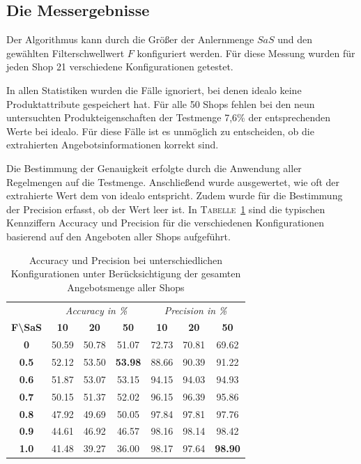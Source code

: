 \subsection{Die Messergebnisse}
\label{subsec:genauigkeitsmessung}

Der Algorithmus kann durch die Größer der Anlernmenge $SaS$ und den gewählten Filterschwellwert $F$ konfiguriert werden.
Für diese Messung wurden für jeden Shop 21 verschiedene Konfigurationen getestet.

In allen Statistiken wurden die Fälle ignoriert, bei denen idealo keine Produktattribute gespeichert hat.
Für alle 50 Shops fehlen bei den neun untersuchten Produkteigenschaften der Testmenge 7,6\% der entsprechenden Werte
bei idealo.
Für diese Fälle ist es unmöglich zu entscheiden, ob die extrahierten Angebotsinformationen korrekt sind.

Die Bestimmung der Genauigkeit erfolgte durch die Anwendung aller Regelmengen auf die Testmenge.
Anschließend wurde ausgewertet, wie oft der extrahierte Wert dem von idealo entspricht.
Zudem wurde für die Bestimmung der Precision erfasst, ob der Wert leer ist.
In \textsc{Tabelle}~\ref{tab:accuracy-precision} sind die typischen Kennziffern Accuracy und Precision für die
verschiedenen Konfigurationen basierend auf den Angeboten aller Shops aufgeführt.

\begin{table}[h]
    \centering
    \begin{tabular}{ c | c c c | c c c }
        &   \multicolumn{3}{c}{\textit{Accuracy in \%}}    &   \multicolumn{3}{c}{\textit{Precision in \%}} \\
        \textbf{F\textbackslash SaS} & \textbf{10} & \textbf{20} & \textbf{50} & \textbf{10} & \textbf{20} & \textbf{50}  \\
        \hline
        \textbf{0}       &   50.59 &   50.78 &   51.07         &   72.73 &   70.81 &   69.62 \\
        \textbf{0.5}     &   52.12 &   53.50 &   \textbf{53.98}&   88.66 &   90.39 &   91.22 \\
        \textbf{0.6}     &   51.87 &   53.07 &   53.15         &   94.15 &   94.03 &   94.93 \\
        \textbf{0.7}     &   50.15 &   51.37 &   52.02         &   96.15 &   96.39 &   95.86 \\
        \textbf{0.8}     &   47.92 &   49.69 &   50.05         &   97.84 &   97.81 &   97.76 \\
        \textbf{0.9}     &   44.61 &   46.92 &   46.57         &   98.16 &   98.14 &   98.42 \\
        \textbf{1.0}     &   41.48 &   39.27 &   36.00         &   98.17 &   97.64 &   \textbf{98.90}

    \end{tabular}
    \caption{Accuracy und Precision bei unterschiedlichen Konfigurationen unter Berücksichtigung der gesamten
    Angebotsmenge aller Shops}
    \label{tab:accuracy-precision}
    \vspace{-0.25cm}
\end{table}

